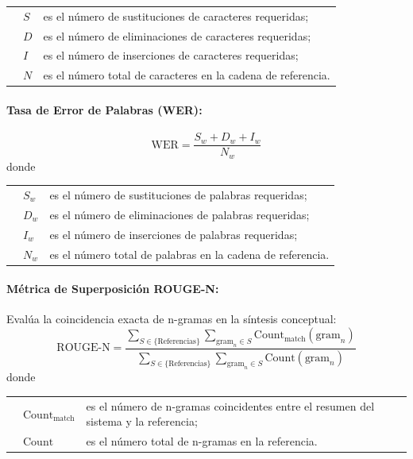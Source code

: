 \noindent\begin{tabular}{@{} p{1cm} l p{8.0cm} @{}}
  & $S$ & es el número de sustituciones de caracteres requeridas; \\
  & $D$ & es el número de eliminaciones de caracteres requeridas; \\
  & $I$ & es el número de inserciones de caracteres requeridas; \\
  & $N$ & es el número total de caracteres en la cadena de referencia.
\end{tabular}

\paragraph{Tasa de Error de Palabras (WER):}
\begin{equation}
\text{WER} = \frac{S_w + D_w + I_w}{N_w}
\end{equation}
\noindent donde

\noindent\begin{tabular}{@{} p{1cm} l p{8.0cm} @{}}
  & $S_w$ & es el número de sustituciones de palabras requeridas; \\
  & $D_w$ & es el número de eliminaciones de palabras requeridas; \\
  & $I_w$ & es el número de inserciones de palabras requeridas; \\
  & $N_w$ & es el número total de palabras en la cadena de referencia.
\end{tabular}

\paragraph{Métrica de Superposición ROUGE-N:}
Evalúa la coincidencia exacta de n-gramas en la síntesis conceptual:
\begin{equation}
\text{ROUGE-N} = \frac{\sum_{S \in \{\text{Referencias}\}} \sum_{\text{gram}_n \in S} \text{Count}_{\text{match}}(\text{gram}_n)}{\sum_{S \in \{\text{Referencias}\}} \sum_{\text{gram}_n \in S} \text{Count}(\text{gram}_n)}
\end{equation}
\noindent donde

\noindent\begin{tabular}{@{} p{1cm} l p{8.0cm} @{}}
  & $\text{Count}_{\text{match}}$ & es el número de n-gramas coincidentes entre el resumen del sistema y la referencia; \\
  & $\text{Count}$ & es el número total de n-gramas en la referencia.
\end{tabular}

